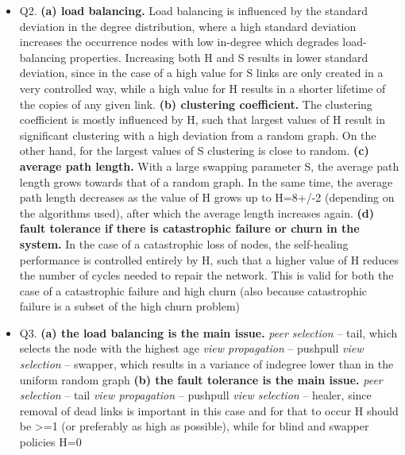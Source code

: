 \documentclass[10pt]{proc}
\begin{document}
\begin{itemize}
\item Q2. %
 \textbf{(a) load balancing.}
Load balancing is influenced by the standard deviation in the degree distribution, where a high standard deviation increases the occurrence nodes with low in-degree which degrades load-balancing properties. Increasing both H and S results in lower standard deviation, since in the case of a high value for S links are only created in a very controlled way, while a high value for H results in a shorter lifetime of the copies of any given link.
\newline \textbf{(b) clustering coefficient.}
The clustering coefficient is mostly influenced by H, such that largest values of H result in significant clustering with a high deviation from a random graph. On the other hand, for the largest values of S clustering is close to random.
\newline \textbf{(c) average path length.}
With a large swapping parameter S, the average path length grows towards that of a random graph. In the same time, the average path length decreases as the value of H grows up to H=8+/-2 (depending on the algorithms used), after which the average length increases again.
\newline  \textbf{(d) fault tolerance if there is catastrophic failure or churn in the system.}
In the case of a catastrophic loss of nodes, the self-healing performance is controlled
entirely by H, such that a higher value of H reduces the number of cycles needed to repair the network. This is valid for both the case of a catastrophic failure and high churn (also because catastrophic failure is a subset of the high churn problem)

\item Q3. %
\textbf{(a) the load balancing is the main issue.}
\newline \emph{peer selection} -- tail, which selects the node with the highest age
\newline \emph{view propagation} -- pushpull
\newline \emph{view selection} -- swapper, which results in a variance of indegree lower than in the uniform random graph
 \newline \textbf{(b) the fault tolerance is the main issue.}
\newline \emph{peer selection} -- tail
\newline \emph{view propagation} -- pushpull
\newline \emph{view selection} -- healer, since removal of dead links is important in this case and for that to occur H should be >=1 (or preferably as high as possible), while for blind and swapper policies H=0


\end{itemize}



\end{document}
